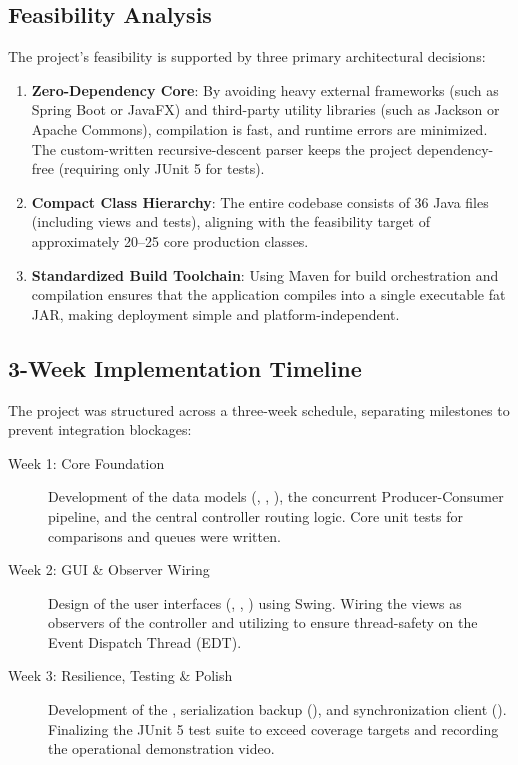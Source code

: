 \subsection{Feasibility Analysis}
The project's feasibility is supported by three primary architectural decisions:
\begin{enumerate}
    \item \textbf{Zero-Dependency Core}: By avoiding heavy external frameworks (such as Spring Boot or JavaFX) and third-party utility libraries (such as Jackson or Apache Commons), compilation is fast, and runtime errors are minimized. The custom-written  recursive-descent parser keeps the project dependency-free (requiring only JUnit 5 for tests).
    \item \textbf{Compact Class Hierarchy}: The entire codebase consists of 36 Java files (including views and tests), aligning with the feasibility target of approximately 20--25 core production classes.
    \item \textbf{Standardized Build Toolchain}: Using Maven for build orchestration and compilation ensures that the application compiles into a single executable fat JAR, making deployment simple and platform-independent.
\end{enumerate}

\subsection{3-Week Implementation Timeline}
The project was structured across a three-week schedule, separating milestones to prevent integration blockages:
\begin{description}
    \item[Week 1: Core Foundation] Development of the data models (, , ), the concurrent Producer-Consumer pipeline, and the central controller routing logic. Core unit tests for comparisons and queues were written.
    \item[Week 2: GUI \& Observer Wiring] Design of the user interfaces (, , ) using Swing. Wiring the views as observers of the controller and utilizing \allowbreak{} to ensure thread-safety on the Event Dispatch Thread (EDT).
    \item[Week 3: Resilience, Testing \& Polish] Development of the \allowbreak{}, serialization backup (\allowbreak{}), and synchronization client (\allowbreak{}). Finalizing the JUnit 5 test suite to exceed coverage targets and recording the operational demonstration video.
\end{description}

